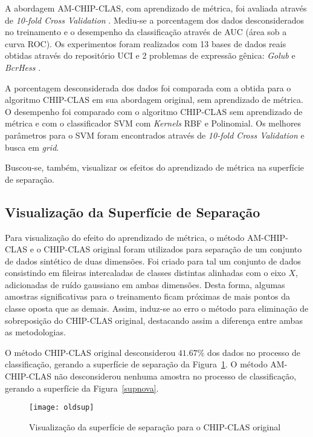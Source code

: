 \documentclass[
	12pt,				%
	openright,			%
	twoside,			%
	a4paper,			%
	english,			%
	spanish,			%
	brazil,				%
	]{abntex2}\usepackage[]{graphicx}\usepackage[]{color}
\begin{document}
A abordagem AM-CHIP-CLAS, com aprendizado de métrica, foi avaliada através de \textit{10-fold Cross Validation} \cite{Kohavi1995}. Mediu-se a porcentagem dos dados desconsiderados no treinamento e o desempenho da classificação através de AUC (área sob a curva ROC). Os experimentos foram realizados com 13 bases de dados reais obtidas através do repositório UCI \cite{UCI} e 2 problemas de expressão gênica: \textit{Golub} \cite{Golub1999} e \textit{BcrHess} \cite{Hess2006}.
\par A porcentagem desconsiderada dos dados foi comparada com a obtida para o algoritmo CHIP-CLAS em sua abordagem original, sem aprendizado de métrica. O desempenho foi comparado com o algoritmo CHIP-CLAS sem aprendizado de métrica e com o classificador SVM com \textit{Kernels} RBF e Polinomial. Os melhores parâmetros para o SVM foram encontrados através de \textit{10-fold Cross Validation} e busca em \textit{grid}.
\par Buscou-se, também, visualizar os efeitos do aprendizado de métrica na superfície de separação.

\subsection{Visualização da Superfície de Separação}

Para visualização do efeito do aprendizado de métrica, o método AM-CHIP-CLAS e o CHIP-CLAS original foram utilizados para separação de um conjunto de dados sintético de duas dimensões. Foi criado para tal um conjunto de dados consistindo em fileiras intercaladas de classes distintas alinhadas com o eixo $X$, adicionadas de ruído gaussiano em ambas dimensões. Desta forma, algumas amostras significativas para o treinamento ficam próximas de mais pontos da classe oposta que as demais. Assim, induz-se ao erro o método para eliminação de sobreposição do CHIP-CLAS original, destacando assim a diferença entre ambas as metodologias.
\par O método CHIP-CLAS original desconsiderou $41.67\%$ dos dados no processo de classificação, gerando a superfície de separação da Figura~\ref{supvelha}. O método AM-CHIP-CLAS não desconsiderou nenhuma amostra no processo de classificação, gerando a superfície da Figura~\ref{supnova}.

\begin{figure}[ht]
\texttt{[image: oldsup]}
\caption{Visualização da superfície de separação para o CHIP-CLAS original}
\label{supvelha}
\end{figure}
\end{document}
